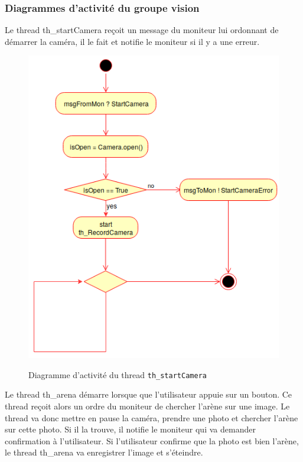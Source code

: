 \documentclass[11pt, a4paper]{paper}
\begin{document}
\subsubsection{Diagrammes d'activité du groupe vision}
{Le thread th\_startCamera reçoit un message du moniteur lui ordonnant de démarrer la caméra, il le fait et notifie le moniteur si il y a une erreur.}

\begin{figure}[htbp]
\label{fig:act_envoyer}
\begin{center}
{\includegraphics[scale=.3]{./dossier_conception/th_startCamera}}
{\caption{Diagramme d'activité du thread {\tt th\_startCamera}}}
\end{center}
\end{figure}
\FloatBarrier

{Le thread th\_arena démarre lorsque que l'utilisateur appuie sur un bouton. Ce thread reçoit alors un ordre du moniteur de chercher l'arène sur une image. Le thread va donc mettre en pause la caméra, prendre une photo et chercher l'arène sur cette photo. Si il la trouve, il notifie le moniteur qui va demander confirmation à l'utilisateur. Si l'utilisateur confirme que la photo est bien l'arène, le thread th\_arena va enregistrer l'image et s'éteindre. }
\end{document}

